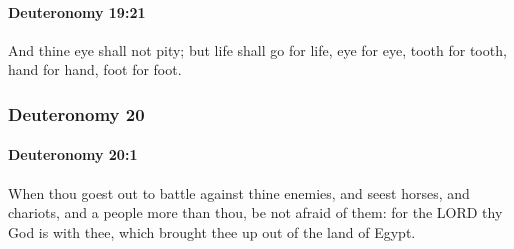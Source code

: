 		\paragraph{Deuteronomy 19:21} %
			\label{DEUTERONOMY-19-21}

			And thine eye shall not pity; but life shall go for life, eye for eye, tooth for tooth, hand for hand, foot for foot.

	\subsubsection{Deuteronomy 20} %
		\label{DEUTERONOMY-20}

		\paragraph{Deuteronomy 20:1} %
			\label{DEUTERONOMY-20-1}

			When thou goest out to battle against thine enemies, and seest horses, and chariots, and a people more than thou, be not afraid of them: for the LORD thy God is with thee, which brought thee up out of the land of Egypt.

